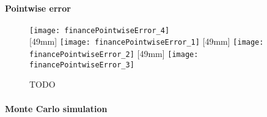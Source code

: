 \paragraph{Pointwise error}

\dummytext[2]{}

\begin{figure}
  \texttt{[image: financePointwiseError\_4]}%
  \\[2mm]%
  [49mm]{%
    \texttt{[image: financePointwiseError\_1]}%
  }%
  \hfill%
  [49mm]{%
    \texttt{[image: financePointwiseError\_2]}%
  }%
  \hfill%
  [49mm]{%
    \texttt{[image: financePointwiseError\_3]}%
  }%
  \caption[TODO]{%
    TODO%
  }%
  \label{fig:financePointwiseError}%
\end{figure}

\paragraph{Monte Carlo simulation}


